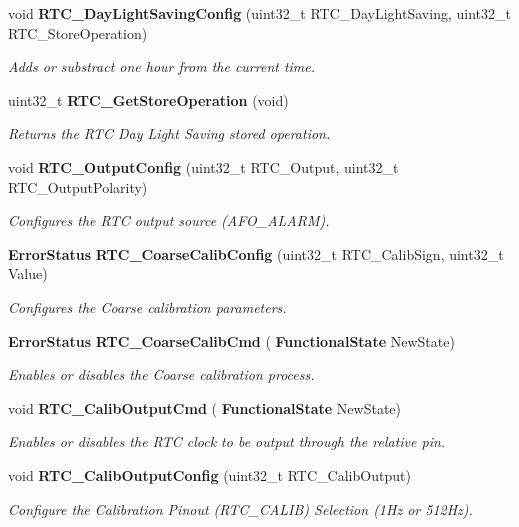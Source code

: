 \begin{DoxyCompactItemize}
void \textbf{ R\+T\+C\+\_\+\+Day\+Light\+Saving\+Config} (uint32\+\_\+t R\+T\+C\+\_\+\+Day\+Light\+Saving, uint32\+\_\+t R\+T\+C\+\_\+\+Store\+Operation)
\begin{DoxyCompactList}\small\item\em Adds or substract one hour from the current time. \end{DoxyCompactList}\item 
uint32\+\_\+t \textbf{ R\+T\+C\+\_\+\+Get\+Store\+Operation} (void)
\begin{DoxyCompactList}\small\item\em Returns the R\+TC Day Light Saving stored operation. \end{DoxyCompactList}\item 
void \textbf{ R\+T\+C\+\_\+\+Output\+Config} (uint32\+\_\+t R\+T\+C\+\_\+\+Output, uint32\+\_\+t R\+T\+C\+\_\+\+Output\+Polarity)
\begin{DoxyCompactList}\small\item\em Configures the R\+TC output source (A\+F\+O\+\_\+\+A\+L\+A\+RM). \end{DoxyCompactList}\item 
\textbf{ Error\+Status} \textbf{ R\+T\+C\+\_\+\+Coarse\+Calib\+Config} (uint32\+\_\+t R\+T\+C\+\_\+\+Calib\+Sign, uint32\+\_\+t Value)
\begin{DoxyCompactList}\small\item\em Configures the Coarse calibration parameters. \end{DoxyCompactList}\item 
\textbf{ Error\+Status} \textbf{ R\+T\+C\+\_\+\+Coarse\+Calib\+Cmd} (\textbf{ Functional\+State} New\+State)
\begin{DoxyCompactList}\small\item\em Enables or disables the Coarse calibration process. \end{DoxyCompactList}\item 
void \textbf{ R\+T\+C\+\_\+\+Calib\+Output\+Cmd} (\textbf{ Functional\+State} New\+State)
\begin{DoxyCompactList}\small\item\em Enables or disables the R\+TC clock to be output through the relative pin. \end{DoxyCompactList}\item 
void \textbf{ R\+T\+C\+\_\+\+Calib\+Output\+Config} (uint32\+\_\+t R\+T\+C\+\_\+\+Calib\+Output)
\begin{DoxyCompactList}\small\item\em Configure the Calibration Pinout (R\+T\+C\+\_\+\+C\+A\+L\+IB) Selection (1\+Hz or 512\+Hz). \end{DoxyCompactList}\item 

\end{DoxyCompactItemize}
